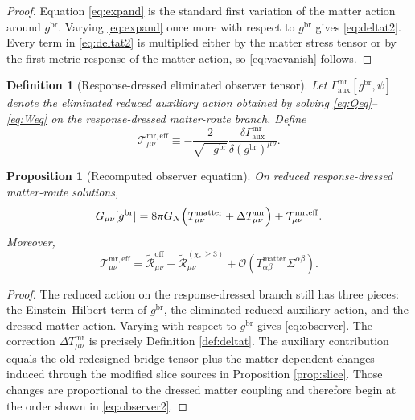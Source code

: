 \documentclass[11pt]{article}
\newcommand{\SigmaMR}{\Sigma}
\newcommand{\ReLong}{\widetilde{\mathcal R}_{\mu\nu}^{(\chi,\ge 3)}}
\newcommand{\ReOff}{\widetilde{\mathcal R}_{\mu\nu}^{\mathrm{off}}}
\newcommand{\DeltaTM}{\Delta T_{\mu\nu}^{\mathrm{mr}}}
\newtheorem{definition}{Definition}
\newtheorem{proposition}{Proposition}
\begin{document}
\begin{proof}
Equation \eqref{eq:expand} is the standard first variation of the matter action around \(g^{\mathrm{br}}\). Varying \eqref{eq:expand} once more with respect to \(g^{\mathrm{br}}\) gives \eqref{eq:deltat2}. Every term in \eqref{eq:deltat2} is multiplied either by the matter stress tensor or by the first metric response of the matter action, so \eqref{eq:vacvanish} follows.
\end{proof}

\begin{definition}[Response-dressed eliminated observer tensor]
\label{def:mrteff}
Let \(\Gamma_{\mathrm{aux}}^{\mathrm{mr}}[g^{\mathrm{br}},\psi]\) denote the eliminated reduced auxiliary action obtained by solving \eqref{eq:Qeq}--\eqref{eq:Weq} on the response-dressed matter-route branch. Define
\begin{equation}
\mathcal T_{\mu\nu}^{\mathrm{mr,eff}}
\equiv
-\frac{2}{\sqrt{-g^{\mathrm{br}}}}
\frac{\delta\Gamma_{\mathrm{aux}}^{\mathrm{mr}}}{\delta (g^{\mathrm{br}})^{\mu\nu}}.
\label{eq:mrteff}
\end{equation}
\end{definition}

\begin{proposition}[Recomputed observer equation]
\label{prop:observer}
On reduced response-dressed matter-route solutions,
\begin{equation}
G_{\mu\nu}[g^{\mathrm{br}}]
=
8\pi G_N
\Bigl(
T_{\mu\nu}^{\mathrm{matter}}+\DeltaTM
\Bigr)
+\mathcal T_{\mu\nu}^{\mathrm{mr,eff}}.
\label{eq:observer}
\end{equation}
Moreover,
\begin{equation}
\mathcal T_{\mu\nu}^{\mathrm{mr,eff}}
=
\ReOff+\ReLong
+\mathcal O\!\left(T_{\alpha\beta}^{\mathrm{matter}}\SigmaMR^{\alpha\beta}\right).
\label{eq:observer2}
\end{equation}
\end{proposition}

\begin{proof}
The reduced action on the response-dressed branch still has three pieces: the Einstein--Hilbert term of \(g^{\mathrm{br}}\), the eliminated reduced auxiliary action, and the dressed matter action. Varying with respect to \(g^{\mathrm{br}}\) gives \eqref{eq:observer}. The correction \(\DeltaTM\) is precisely Definition \ref{def:deltat}. The auxiliary contribution equals the old redesigned-bridge tensor plus the matter-dependent changes induced through the modified slice sources in Proposition \ref{prop:slice}. Those changes are proportional to the dressed matter coupling and therefore begin at the order shown in \eqref{eq:observer2}.
\end{proof}
\end{document}
